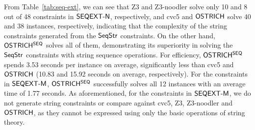 From Table~\ref{tab:seq-ext}, we can see that Z3 and Z3-noodler solve only 10 and 8 out of 48 constraints in ${\sf SEQEXT}\mbox{\sf -N}$, respectively, and cvc5 and ${\sf OSTRICH}$ solve 40 and 38 instances, respectively,
indicating that the complexity of the string constraints generated from the ${\sf SeqStr}$ constraints. %
On the other hand, ${\sf OSTRICH^{SEQ}}$ solves all of them, demonstrating its superiority in solving the ${\sf SeqStr}$ constraints with string sequence operations. For efficiency, %
${\sf OSTRICH^{SEQ}}$ spends 3.53 seconds per instance on average, significantly less than cvc5 and ${\sf OSTRICH}$ (10.83 and 15.92 seconds on average, respectively). For the constraints in ${\sf SEQEXT}\mbox{\sf -M}$, ${\sf OSTRICH^{SEQ}}$ successfully solves all 12 instances with an average time of 1.77 seconds.
As aforementioned, for the constraints in ${\sf SEQEXT}\mbox{\sf -M}$, we do not generate string constraints or compare against cvc5, Z3, Z3-noodler and ${\sf OSTRICH}$, as they cannot be expressed using only the basic operations of string theory.






